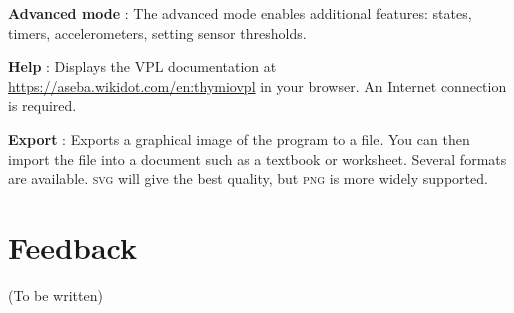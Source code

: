 \textbf{Advanced mode} : The advanced mode enables
additional features: states, timers, accelerometers, setting sensor
thresholds.

\bigskip

\textbf{Help} : Displays the VPL documentation at
\url{https://aseba.wikidot.com/en:thymiovpl} in your browser.
An Internet connection is required.

\bigskip

\textbf{Export} : \label{p.export} Exports a graphical
image of the program to a file. You can then import the file into a
document such as a textbook or worksheet. Several formats are available.
\textsc{svg} will give the best quality, but \textsc{png} is more widely
supported.

\section*{Feedback}

(To be written)

\label{p.feedback}
